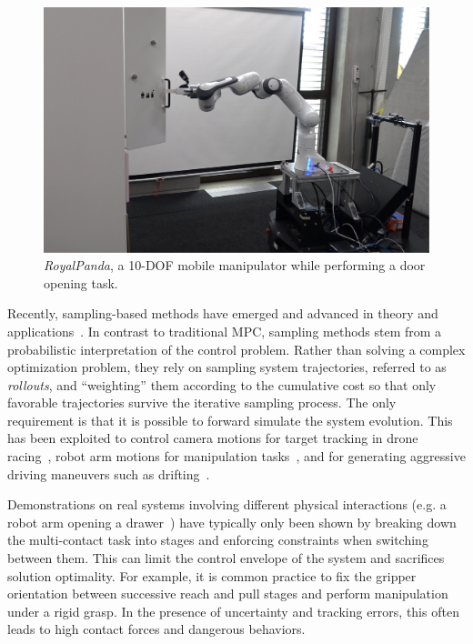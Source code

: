 \begin{figure}[t]
\centering
\includegraphics[trim={0 0 0 100},clip,width=0.9\columnwidth]{framework_manipulation/figures/hardware/system_figure.pdf}
\caption{\textit{RoyalPanda}, a 10-DOF mobile manipulator while performing a door opening task.} \label{fig:royal_panda}
\end{figure}

Recently, sampling-based methods have emerged and advanced in theory and applications~\cite{lee_aggressive_2020,abraham_model-based_2020,williams_information_nodate,williams_information_2017,rajamaki_augmenting_2017}. 
In contrast to traditional MPC, sampling methods stem from a probabilistic interpretation of the control problem. 
Rather than solving a complex optimization problem, they rely on sampling system trajectories, referred to as \textit{rollouts}, and ``weighting'' them according to the cumulative cost so that only favorable trajectories survive the iterative sampling process. The only requirement is that it is possible to forward simulate the system evolution. This has been exploited to control camera motions for target tracking in drone racing~\cite{lee_aggressive_2020}, robot arm motions for manipulation tasks~\cite{abraham_model-based_2020}, and for generating aggressive driving maneuvers such as drifting~\cite{williams_information_nodate, williams_information_2017}. 

Demonstrations on real systems involving different physical interactions (e.g. a robot arm opening a drawer~\cite{abraham_model-based_2020}) have typically only been shown by breaking down the multi-contact task into stages and enforcing constraints when switching between them. 
This can limit the control envelope of the system and sacrifices solution optimality. For example, it is common practice to fix the gripper orientation between successive reach and pull stages and perform manipulation under a rigid grasp. In the presence of uncertainty and tracking errors, this often leads to high contact forces and dangerous behaviors.

